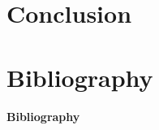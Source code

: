 \documentclass[xcolor=dvipsnames]{beamer}
\begin{document}
\section{Conclusion}

\section{Bibliography}
\begin{frame}{\bf Bibliography}



\end{frame}
\end{document}
